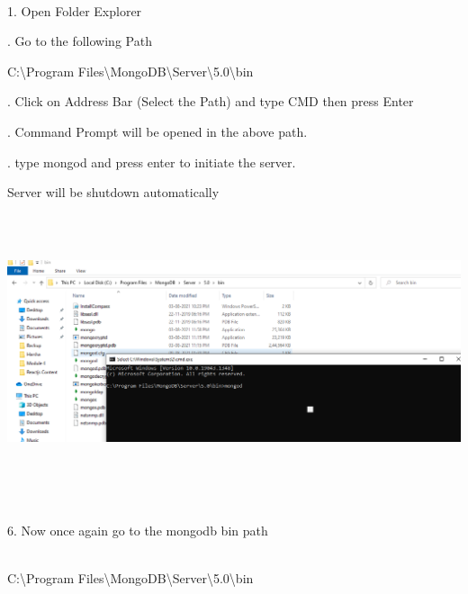\documentclass{article}
\begin{document}
\noindent \\ 1. Open Folder Explorer

. Go to the following Path

\noindent    C:{\textbackslash}Program Files{\textbackslash}MongoDB{\textbackslash}Server{\textbackslash}5.0{\textbackslash}bin

. Click on Address Bar (Select the Path) and type CMD then press Enter

. Command Prompt will be opened in the above path.

. type mongod and press enter to initiate the server.

\noindent Server will be shutdown automatically

\noindent 

\noindent 

\noindent 

\begin{center}
	\noindent \includegraphics*[width=6.40in, height=3.17in]{IMG-04-02}
\end{center}

\noindent 

\noindent \\ 6. Now once again go to the mongodb bin path

\noindent \\   C:{\textbackslash}Program Files{\textbackslash}MongoDB{\textbackslash}Server{\textbackslash}5.0{\textbackslash}bin

\noindent \textbf{\underbar{}}

\begin{center}
	\noindent \textbf{}
\end{center}
\end{document}
